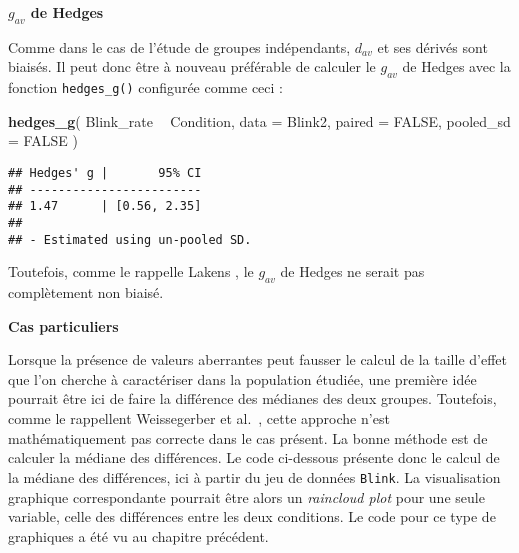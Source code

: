 \documentclass[
  french,
]{book}
\newenvironment{Shaded}{\begin{snugshade}}{\end{snugshade}}
\newcommand{\DataTypeTok}[1]{\textcolor[rgb]{0.13,0.29,0.53}{#1}}
\newcommand{\KeywordTok}[1]{\textcolor[rgb]{0.13,0.29,0.53}{\textbf{#1}}}
\newcommand{\NormalTok}[1]{#1}
\newcommand{\OperatorTok}[1]{\textcolor[rgb]{0.81,0.36,0.00}{\textbf{#1}}}
\newcommand{\OtherTok}[1]{\textcolor[rgb]{0.56,0.35,0.01}{#1}}
\newcommand{\StringTok}[1]{\textcolor[rgb]{0.31,0.60,0.02}{#1}}
\begin{document}
\textbf{\(g_{av}\) de Hedges}

Comme dans le cas de l'étude de groupes indépendants, \(d_{av}\) et ses dérivés sont biaisés. Il peut donc être à nouveau préférable de calculer le \(g_{av}\) de Hedges avec la fonction \texttt{hedges\_g()} configurée comme ceci :

\begin{Shaded}
\begin{Highlighting}[]
\KeywordTok{hedges_g}\NormalTok{(}
\NormalTok{  Blink_rate }\OperatorTok{~}\StringTok{ }\NormalTok{Condition,}
  \DataTypeTok{data =}\NormalTok{ Blink2, }
  \DataTypeTok{paired =} \OtherTok{FALSE}\NormalTok{, }
  \DataTypeTok{pooled_sd =} \OtherTok{FALSE}
\NormalTok{  )}
\end{Highlighting}
\end{Shaded}

\begin{verbatim}
## Hedges' g |       95% CI
## ------------------------
## 1.47      | [0.56, 2.35]
## 
## - Estimated using un-pooled SD.
\end{verbatim}

Toutefois, comme le rappelle Lakens \autocite*{lakensCalculatingReportingEffect2013}, le \(g_{av}\) de Hedges ne serait pas complètement non biaisé.

\textbf{Cas particuliers}

Lorsque la présence de valeurs aberrantes peut fausser le calcul de la taille d'effet que l'on cherche à caractériser dans la population étudiée, une première idée pourrait être ici de faire la différence des médianes des deux groupes. Toutefois, comme le rappellent Weissegerber et al.~\autocite*{weissgerberBarLineGraphs2015}, cette approche n'est mathématiquement pas correcte dans le cas présent. La bonne méthode est de calculer la médiane des différences. Le code ci-dessous présente donc le calcul de la médiane des différences, ici à partir du jeu de données \texttt{Blink}. La visualisation graphique correspondante pourrait être alors un \emph{raincloud plot} pour une seule variable, celle des différences entre les deux conditions. Le code pour ce type de graphiques a été vu au chapitre précédent.
\end{document}
